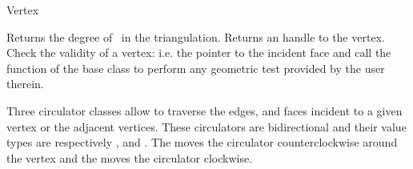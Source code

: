 \begin{ccClass}{Vertex}

{}
{Returns the degree of \ccVar\ in the triangulation.}
\ccGlue
{}
{Returns an handle to the vertex.}
\ccGlue
{} 
{Check the validity of a vertex:
i.e. the pointer to the incident face  and call the 
function of the base class to perform any geometric test provided by the user
therein.}



Three circulator classes allow to traverse the edges, and faces
incident to a given vertex or  the adjacent vertices.
 These circulators are bidirectional
and their value types are respectively , 
and .
The   moves the circulator
counterclockwise around the vertex 
and  the  moves the circulator
clockwise. 





\ccGlue
{}
\ccGlue
{}



\end{ccClass} 

